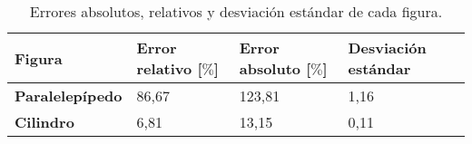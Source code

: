 \documentclass[12pt,letterpaper]{article}
\begin{document}
\begin{table}[H]
\begin{center}

\begin{tabular}{|m{3cm}|m{3cm}|m{3cm}|m{3cm}|}
\hline 
\textbf{Figura} & \textbf{Error relativo} [$\%$] & \textbf{Error absoluto} [$\%$] & \textbf{Desviación estándar} \\ 
\hline 
\textbf{Paralelepípedo} & 86,67 & 123,81 & 1,16 \\ 
\hline 
\textbf{Cilindro} & 6,81 & 13,15 & 0,11 \\ 
\hline 
\end{tabular} 

\caption{Errores absolutos, relativos y desviación estándar de cada figura.}

\label{Tab:Errores}
\end{center}
\end{table}





\nocite{*} %

\end{document}
